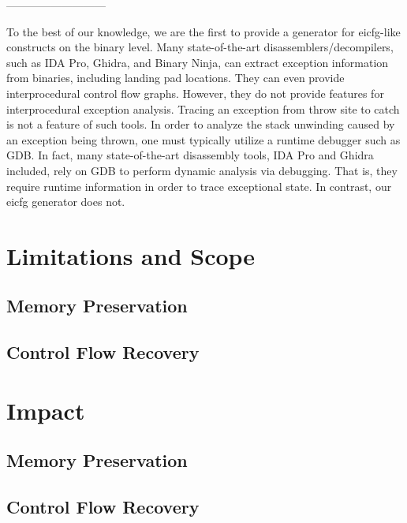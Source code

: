 ---------------------------

To the best of our knowledge, we are the first to provide a generator for
\ac{eicfg}-like constructs on the binary level.
Many state-of-the-art disassemblers/decompilers, such as IDA Pro, Ghidra, and Binary Ninja,
can extract exception information from binaries, including landing pad locations.
They can even provide interprocedural control flow graphs.
However, they do not provide features for interprocedural exception analysis.
Tracing an exception from throw site to catch is not a feature of such tools.
In order to analyze the stack unwinding caused by an exception being thrown,
one must typically utilize a runtime debugger such as GDB.
In fact, many state-of-the-art disassembly tools, IDA Pro and Ghidra included,
rely on GDB to perform dynamic analysis via debugging.
That is, they require runtime information in order to trace exceptional state.
In contrast, our \ac{eicfg} generator does not.

\section{Limitations and Scope}

\subsection{Memory Preservation}

\subsection{Control Flow Recovery}

\section{Impact}

\subsection{Memory Preservation}

\subsection{Control Flow Recovery}





